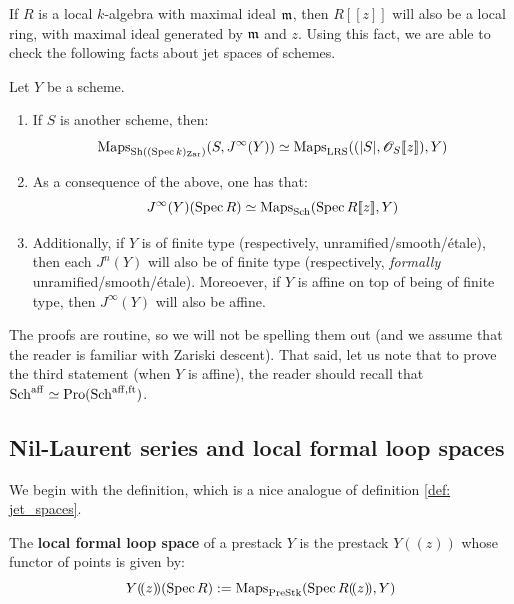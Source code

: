         If $R$ is a local $k$-algebra with maximal ideal $\mathfrak{m}$, then $R[\![z]\!]$ will also be a local ring, with maximal ideal generated by $\mathfrak{m}$ and $z$. Using this fact, we are able to check the following facts about jet spaces of schemes. 
        \begin{lemma} \label{lemma: basic_properties_of_jet_spaces}
            Let $Y$ be a scheme.
            \begin{enumerate}
                \item If $S$ is another scheme, then:
                    $$\operatorname{Maps}_{\mathrm{Sh}( (\operatorname{Spec} k)_{\mathrm{Zar}} )}( S, J^{\infty}(Y) ) \simeq \operatorname{Maps}_{\mathrm{LRS}}( (|S|, \mathscr{O}_S[\![z]\!]), Y )$$
                \item As a consequence of the above, one has that:
                    $$J^{\infty}(Y)(\operatorname{Spec} R) \simeq \operatorname{Maps}_{\mathrm{Sch}}(\operatorname{Spec} R[\![z]\!], Y)$$
                \item Additionally, if $Y$ is of finite type (respectively, unramified/smooth/\'etale), then each $J^n(Y)$ will also be of finite type (respectively, \textit{formally} unramified/smooth/\'etale). Moreoever, if $Y$ is affine on top of being of finite type, then $J^{\infty}(Y)$ will also be affine.
            \end{enumerate}
        \end{lemma}
        The proofs are routine, so we will not be spelling them out (and we assume that the reader is familiar with Zariski descent). That said, let us note that to prove the third statement (when $Y$ is affine), the reader should recall that $\mathrm{Sch}^{\mathrm{aff}} \simeq \mathrm{Pro}(\mathrm{Sch}^{\mathrm{aff}, \mathrm{ft}})$.

        \begin{lemma} \label{lemma: gluing_jet_spaces}
            
        \end{lemma}

    \subsection{Nil-Laurent series and local formal loop spaces}
        We begin with the definition, which is a nice analogue of definition \ref{def: jet_spaces}.
        \begin{definition} \label{def: local_formal_loop_spaces}
            The \textbf{local formal loop space} of a prestack $Y$ is the prestack $Y(\!(z)\!)$ whose functor of points is given by:
                $$Y(\!(z)\!)(\operatorname{Spec} R) := \operatorname{Maps}_{\mathrm{Pre}\mathrm{Stk}}(\operatorname{Spec} R(\!(z)\!), Y)$$
        \end{definition}
    
